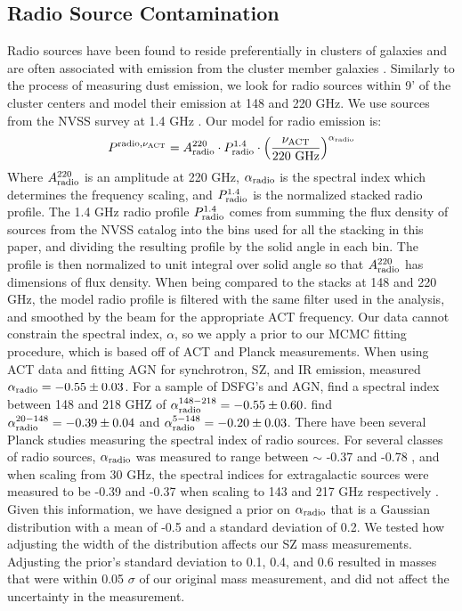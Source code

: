 \documentclass[a4paper,fleqn,usenatbib]{mnras}
\begin{document}
\subsection{Radio Source Contamination}
\label{sec:radioprof}
Radio sources have been found to reside preferentially in clusters of galaxies and are often associated with emission from the cluster member galaxies \citep{2002ApJ...580...36H,2007ApJS..170...71L,2007AJ....134..897C,2009ApJ...694..992L, 2011ApJ...734..103G}. 
Similarly to the process of measuring dust emission, we look for radio sources within 9' of the cluster centers and model their emission at 148 and 220 GHz. 
We use sources from the NVSS survey at 1.4 GHz \citep{1998AJ....115.1693C}. 
Our model for radio emission is:
\begin{equation}
  \label{eq:radioSED}
  \centering
  P^{\rm radio, \nu_{\rm ACT}} = A^{220}_{\rm radio} \cdot P^{1.4}_{\rm radio} \cdot \left(\frac{\nu_{\rm ACT}}{220 \ \rm GHz}\right)^{\alpha_{\rm radio}}  
\end{equation}
Where $A^{220}_{\rm radio}$ is an amplitude at 220 GHz, $\alpha_{\rm radio}$ is the spectral index which determines the frequency scaling, and $P^{1.4}_{\rm radio}$ is the normalized stacked radio profile.
The 1.4 GHz radio profile $P^{1.4}_{\rm radio}$ comes from summing the flux density of sources from the NVSS catalog into the bins used for all the stacking in this paper, and dividing the resulting profile by the solid angle in each bin. 
The profile is then normalized to unit integral over solid angle so that $A^{220}_{\rm radio}$ has dimensions of flux density.
When being compared to the stacks at 148 and 220 GHz, the model radio profile is filtered with the same filter used in the analysis, and smoothed by the beam for the appropriate ACT frequency.
Our data cannot constrain the spectral index, $\alpha$, so we apply a prior to our MCMC fitting procedure, which is based off of ACT and Planck measurements.
When using ACT data and fitting AGN for synchrotron, SZ, and IR emission, \cite{2014MNRAS.445..460G} measured $\alpha_{\rm radio} = -0.55 \pm 0.03$.
For a sample of DSFG's and AGN, \cite{2014MNRAS.439.1556M} find a spectral index between 148 and 218 GHZ of $\alpha^{148-218}_{\rm radio} = -0.55 \pm 0.60$.
\cite{2011ApJ...731..100M} find $\alpha^{20-148}_{\rm radio} = -0.39 \pm 0.04$ and $\alpha^{5-148}_{\rm radio} = -0.20 \pm 0.03$.
There have been several Planck studies measuring the spectral index of radio sources.
For several classes of radio sources, $\alpha_{\rm radio}$ was measured to range between $\sim$ -0.37 and -0.78  \citep{2016A&A...596A.106P}, and when scaling from 30 GHz, the spectral indices for extragalactic sources were measured to be -0.39 and -0.37 when scaling to 143 and 217 GHz respectively \citep{2011A&A...536A..12P}.
Given this information, we have designed a prior on $\alpha_{\rm radio}$ that is a Gaussian distribution with a mean of -0.5 and a standard deviation of 0.2.
We tested how adjusting the width of the distribution affects our SZ mass measurements.
Adjusting the prior's standard deviation to 0.1, 0.4, and 0.6 resulted in masses that were within 0.05 $\sigma$ of our original mass measurement, and did not affect the uncertainty in the measurement.
\end{document}

